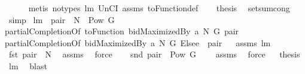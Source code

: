 \begin{isabellebody}
\ \ \ \ \isamarkupfalse%
\ {\isacharparenleft}metis\ {\isacharparenleft}no{\isacharunderscore}types{\isacharparenright}\ lm{}{}\ UnCI\ assms{\isacharparenleft}{}{\isacharparenright}\ toFunction{\isacharunderscore}def{\isacharparenright}\isanewline
\ \ \isamarkupfalse%
\isanewline
\isacommand{{\isacharbraceright}}\isamarkupfalse%
\isanewline
{}\isamarkupfalse%
\ {\isacharquery}thesis\ \isamarkupfalse%
\ setsum{\isachardot}cong\ \isamarkupfalse%
\ simp\isanewline
{}\isamarkupfalse%
%
\endisatagproof
{\isafoldproof}%
%
\isadelimproof
\isanewline
%
\endisadelimproof
\isanewline
{}\isamarkupfalse%
\ lm{}{}{\isacharcolon}\ \ {\isachardoublequoteopen}pair\ {\isasymin}\ N\ {\isasymtimes}\ {\isacharparenleft}Pow\ G\ {\isacharminus}\ {\isacharbraceleft}{\isacharbraceleft}{\isacharbraceright}{\isacharbraceright}{\isacharparenright}{\isachardoublequoteclose}\ \ \isanewline
{\isachardoublequoteopen}partialCompletionOf\ {\isacharparenleft}toFunction\ {\isacharparenleft}bidMaximizedBy\ a\ N\ G{\isacharparenright}{\isacharparenright}\ pair\ {\isacharequal}\ \isanewline
partialCompletionOf\ {\isacharparenleft}{\isacharparenleft}bidMaximizedBy\ a\ N\ G{\isacharparenright}\ Elsee\ {}{\isacharparenright}\ pair{\isachardoublequoteclose}%
\isadelimproof
\ %
\endisadelimproof
%
\isatagproof
{}\isamarkupfalse%
\ assms\ lm{}{}\ \isanewline
{}\isamarkupfalse%
\ {\isacharminus}\ \isanewline
{}\isamarkupfalse%
\ {\isachardoublequoteopen}fst\ pair\ {\isasymin}\ N{\isachardoublequoteclose}\ \isamarkupfalse%
\ assms\ \isamarkupfalse%
\ force\ \isanewline
{}\isamarkupfalse%
\ \isamarkupfalse%
\ {\isachardoublequoteopen}snd\ pair\ {\isasymin}\ Pow\ G\ {\isacharminus}\ {\isacharbraceleft}{\isacharbraceleft}{\isacharbraceright}{\isacharbraceright}{\isachardoublequoteclose}\ \isamarkupfalse%
\ assms{\isacharparenleft}{}{\isacharparenright}\ \isamarkupfalse%
\ force\isanewline
{}\isamarkupfalse%
\ \isamarkupfalse%
\ {\isacharquery}thesis\ \isamarkupfalse%
\ lm{}{}\ \isamarkupfalse%
\ blast\isanewline
{}\isamarkupfalse%
%
\endisatagproof
{\isafoldproof}%
%
\isadelimproof
%
\endisadelimproof

\end{isabellebody}
